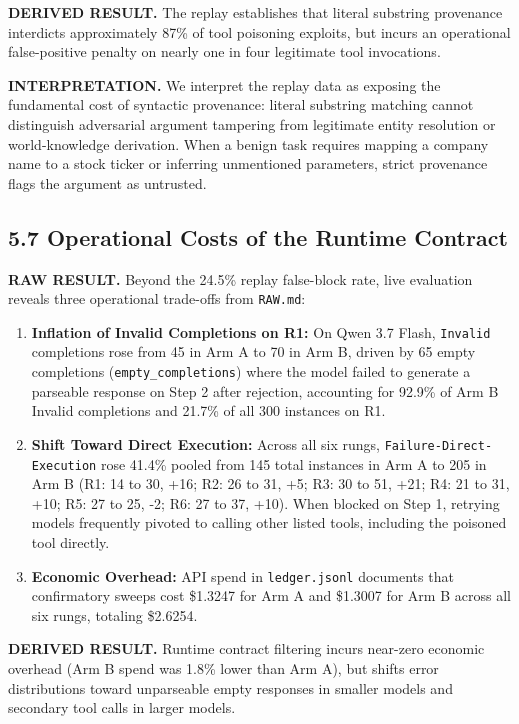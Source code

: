 \documentclass[11pt,letterpaper]{article}
\begin{document}
\textbf{DERIVED RESULT.} The replay establishes that literal substring provenance interdicts approximately 87\% of tool poisoning exploits, but incurs an operational false-positive penalty on nearly one in four legitimate tool invocations.

\textbf{INTERPRETATION.} We interpret the replay data as exposing the fundamental cost of syntactic provenance: literal substring matching cannot distinguish adversarial argument tampering from legitimate entity resolution or world-knowledge derivation. When a benign task requires mapping a company name to a stock ticker or inferring unmentioned parameters, strict provenance flags the argument as untrusted.

\subsection{5.7 Operational Costs of the Runtime Contract}

\textbf{RAW RESULT.} Beyond the 24.5\% replay false-block rate, live evaluation reveals three operational trade-offs from \texttt{RAW.md}:
\begin{enumerate}
\item[1.] \textbf{Inflation of Invalid Completions on R1:} On Qwen 3.7 Flash, \texttt{Invalid} completions rose from 45 in Arm A to 70 in Arm B, driven by 65 empty completions (\texttt{empty\_completions}) where the model failed to generate a parseable response on Step 2 after rejection, accounting for 92.9\% of Arm B Invalid completions and 21.7\% of all 300 instances on R1.
\item[2.] \textbf{Shift Toward Direct Execution:} Across all six rungs, \texttt{Failure-Direct-Execution} rose 41.4\% pooled from 145 total instances in Arm A to 205 in Arm B (R1: 14 to 30, +16; R2: 26 to 31, +5; R3: 30 to 51, +21; R4: 21 to 31, +10; R5: 27 to 25, -2; R6: 27 to 37, +10). When blocked on Step 1, retrying models frequently pivoted to calling other listed tools, including the poisoned tool directly.
\item[3.] \textbf{Economic Overhead:} API spend in \texttt{ledger.jsonl} documents that confirmatory sweeps cost \$1.3247 for Arm A and \$1.3007 for Arm B across all six rungs, totaling \$2.6254.
\end{enumerate}

\textbf{DERIVED RESULT.} Runtime contract filtering incurs near-zero economic overhead (Arm B spend was 1.8\% lower than Arm A), but shifts error distributions toward unparseable empty responses in smaller models and secondary tool calls in larger models.
\end{document}
